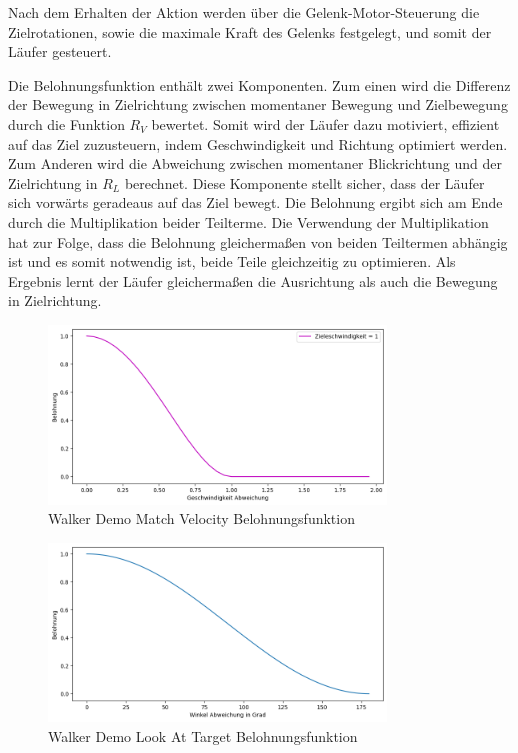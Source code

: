 Nach dem Erhalten der Aktion werden über die Gelenk-Motor-Steuerung die Zielrotationen, sowie die maximale Kraft des Gelenks festgelegt, und somit der Läufer gesteuert.

Die Belohnungsfunktion enthält zwei Komponenten. Zum einen wird die Differenz der Bewegung in Zielrichtung zwischen momentaner Bewegung und Zielbewegung durch die Funktion $R_V$ bewertet. Somit wird der Läufer dazu motiviert, effizient auf das Ziel zuzusteuern, indem Geschwindigkeit und Richtung optimiert werden. Zum Anderen wird die Abweichung zwischen momentaner Blickrichtung und der Zielrichtung in $R_L$ berechnet. Diese Komponente stellt sicher, dass der Läufer sich vorwärts geradeaus auf das Ziel bewegt. Die Belohnung ergibt sich am Ende durch die Multiplikation beider Teilterme. Die Verwendung der Multiplikation hat zur Folge, dass die Belohnung gleichermaßen von beiden Teiltermen abhängig ist und es somit notwendig ist, beide Teile gleichzeitig zu optimieren. Als Ergebnis lernt der Läufer gleichermaßen die Ausrichtung als auch die Bewegung in Zielrichtung.

\begin{figure}[H]
  \centering  
  \includegraphics[width=0.8\textwidth]{img/plot_demo_vel_1}
  \caption{Walker Demo Match Velocity Belohnungsfunktion}
  \label{fig:plot_demo_vel_1}
\end{figure}

\begin{figure}[H]
  \centering  
  \includegraphics[width=0.8\textwidth]{img/plot_demo_look}
  \caption{Walker Demo Look At Target Belohnungsfunktion}
  \label{fig:plot_demo_look}
\end{figure}


